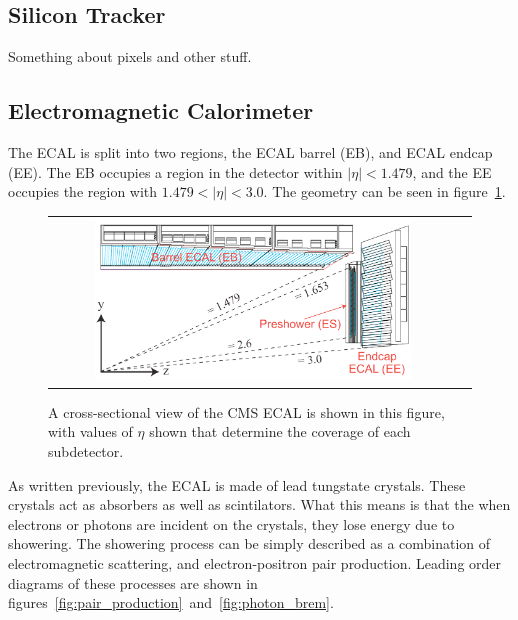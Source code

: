 \subsection{Silicon Tracker}
\label {subs:tracker}
Something about pixels and other stuff.

\subsection{Electromagnetic Calorimeter}
\label {subs:ECAL}
The ECAL is split into two regions, the ECAL barrel (EB), and ECAL endcap (EE).
The EB occupies a region in the detector within $|\eta| < 1.479$, and the EE occupies the region with $1.479 < |\eta| < 3.0$.
The geometry can be seen in figure~\ref{fig:ecal_eta}.

\begin{figure}[!ht]
\begin{center}
\begin{tabular}{cc}
\includegraphics[width=0.8\textwidth]{cms/figs/Figures_Experimental_Apparatus_ECALRapidity.png}
\end{tabular}
\caption{ A cross-sectional view of the CMS ECAL is shown in this figure, with values of $\eta$ shown that determine the coverage of each subdetector.
\label{fig:ecal_eta}
}
\end{center}
\end{figure}

\clearpage

As written previously, the ECAL is made of lead tungstate crystals.
These crystals act as absorbers as well as scintilators.
What this means is that the when electrons or photons are incident on the crystals, they lose energy due to showering.
The showering process can be simply described as a combination of electromagnetic scattering, and electron-positron pair production.
Leading order diagrams of these processes are shown in figures~\ref{fig:pair_production}~and~\ref{fig:photon_brem}.

